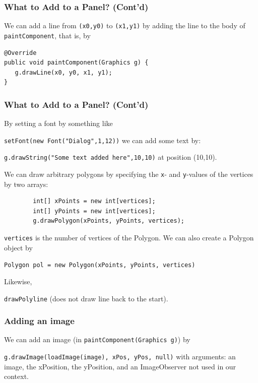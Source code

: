 \documentclass{beamer}
\def\mcolor#1#2{\rule{0ex}{0ex}\color{#1}#2\color{black}{}}
\begin{document}
\begin{frame}[fragile]
\frametitle{What to Add to a Panel? (Cont'd)}

We can add a line from \texttt{(x0,y0)} to \texttt{(x1,y1)} by adding the line to the body of \texttt{paintComponent}, that is, by
        
\begin{verbatim}
@Override
public void paintComponent(Graphics g) {
   g.drawLine(x0, y0, x1, y1);
}
\end{verbatim}

\end{frame}

\begin{frame}[fragile]
\frametitle{What to Add to a Panel? (Cont'd)}
By setting a font by something like\\
\mcolor{blue}{\texttt{setFont(new Font("Dialog",1,12))}} we can add some text by:\\
\mcolor{blue}{\texttt{g.drawString("Some text added here",10,10)}} at position (10,10).

We can draw arbitrary polygons by specifying the \texttt{x}- and
\texttt{y}-values of the vertices by two arrays:
\begin{verbatim}
        int[] xPoints = new int[vertices];
        int[] yPoints = new int[vertices];
        g.drawPolygon(xPoints, yPoints, vertices);
\end{verbatim}
\texttt{vertices} is the number of vertices of the Polygon.
We can also create a Polygon object by \\
\mcolor{blue}{\texttt{Polygon pol = new Polygon(xPoints, yPoints, vertices)}}

Likewise, \mcolor{blue}{\texttt{drawPolyline}} (does not draw line back to the start).
\end{frame}

\begin{frame}
\frametitle{Adding an image}
We can add an image (in \texttt{paintComponent(Graphics g)}) by
\mcolor{blue}{\texttt{g.drawImage(loadImage(image), xPos, yPos, null)}}
with arguments: an image, the xPosition, the yPosition, and an
ImageObserver not used in our context.
\end{frame}
\end{document}
